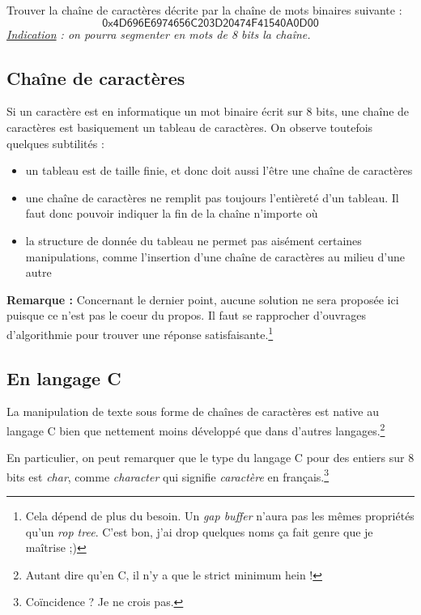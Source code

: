 \documentclass[../../../main.tex]{subfiles}
\begin{document}
Trouver la chaîne de caractères décrite par la chaîne de mots binaires suivante :\newline
$$\textsf{0x4D696E6974656C203D20474F41540A0D00}$$
\textit{\underline{Indication} : on pourra segmenter en mots de 8 bits la chaîne.}
\subsection{Chaîne de caractères}
Si un caractère est en informatique un mot binaire écrit sur 8 bits, une chaîne de caractères est basiquement un tableau de caractères. On observe toutefois quelques subtilités :
\begin{itemize}
	\item un tableau est de taille finie, et donc doit aussi l'être une chaîne de caractères
	\item une chaîne de caractères ne remplit pas toujours l'entièreté d'un tableau. Il faut donc pouvoir indiquer la fin de la chaîne n'importe où
	\item la structure de donnée du tableau ne permet pas aisément certaines manipulations, comme l'insertion d'une chaîne de caractères au milieu d'une autre
\end{itemize}
\textbf{Remarque :} Concernant le dernier point, aucune solution ne sera proposée ici puisque ce n'est pas le coeur du propos. Il faut se rapprocher d'ouvrages d'algorithmie pour trouver une réponse satisfaisante.\footnote{Cela dépend de plus du besoin. Un \textit{gap buffer} n'aura pas les mêmes propriétés qu'un \textit{rop tree}. C'est bon, j'ai drop quelques noms ça fait genre que je maîtrise ;)}
\subsection{En langage C}
La manipulation de texte sous forme de chaînes de caractères est native au langage C bien que nettement moins développé que dans d'autres langages.\footnote{Autant dire qu'en C, il n'y a que le strict minimum hein !}
 
En particulier, on peut remarquer que le type du langage C pour des entiers sur 8 bits est \textit{char}, comme \textit{character} qui signifie \textit{caractère} en français.\footnote{Coïncidence ? Je ne crois pas.}
 
\end{document}
